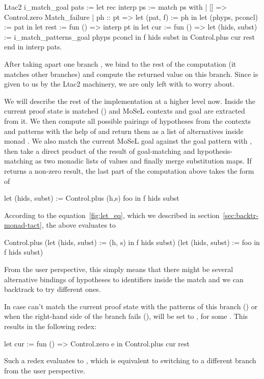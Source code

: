\begin{coq}
Ltac2 i_match_goal pats :=
  let rec interp ps := match ps with
  | [] => Control.zero Match_failure
  | ph :: pt =>
    let (pat, f) := ph in
    let (phyps, pconcl) := pat in
    let rest := fun () => interp pt in
    let cur := fun () =>
      let (hids, subst) := i_match_patterns_goal phyps pconcl in
      f hids subst
    in Control.plus cur rest
  end in
  interp pats.
\end{coq}

After taking apart one branch , we bind  to the rest of the computation (it matches other branches) and compute the returned value on this branch.
Since  is given to us by the Ltac2 machinery, we are only left with  to worry about.

We will describe the rest of the implementation at a higher level now.
Inside  the current proof state is matched () and MoSeL contexts and goal are extracted from it.
We then compute all possible pairings of hypotheses from the contexts and patterns with the help of  and return them as a list of alternatives inside monad .
We also match the current MoSeL goal against the goal pattern  with , then take a direct product of the result of goal-matching and hypothesis-matching as two monadic lists of values and finally merge substitution maps.
If  returns a non-zero result, the last part of the computation above takes the form of
\begin{coq}
let (hids, subst) := Control.plus (h,s) foo in
f hids subst
\end{coq}

According to the equation~\ref{fig:let_eq}, which we described in section~\ref{sec:backtr-monad-tact}, the above evaluates to
\begin{coq}
Control.plus
  (let (hids, subst) := (h, s) in
   f hids subst)
  (let (hids, subst) := foo in
   f hids subst)
\end{coq}

From the user perspective, this simply means that there might be several alternative bindings of hypotheses to identifiers inside the match and we can backtrack to try different ones.

In case  can't match the current proof state with the patterns of this branch () or when the right-hand side of the branch fails (),  will be set to , for some .
This results in the following redex:
\begin{coq}
let cur := fun () => Control.zero e
in Control.plus cur rest
\end{coq}
Such a redex evaluates to , which is equivalent to switching to a different branch from the user perspective.

